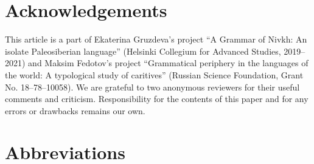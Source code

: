 \documentclass[output=paper,colorlinks,citecolor=brown]{langscibook}
\begin{document}


\section*{Acknowledgements}
This article is a part of Ekaterina Gruzdeva’s project “A Grammar of Nivkh: An isolate Paleosiberian language” (Helsinki Collegium for Advanced Studies, 2019–2021) and Maksim Fedotov’s project “Grammatical periphery in the languages of the world: A typological study of caritives” (Russian Science Foundation, Grant No. 18--78--10058). We are grateful to two anonymous reviewers for their useful comments and criticism. Responsibility for the contents of this paper and for any errors or drawbacks remains our own.

\section*{Abbreviations}
\end{document}
